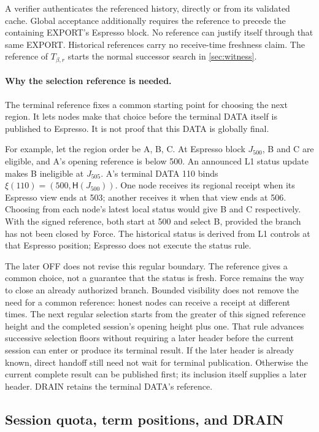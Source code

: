 \documentclass[11pt,a4paper]{article}
\newcommand{\Hash}{\mathsf H}
\begin{document}
A verifier authenticates the referenced history, directly or from its
validated cache. Global acceptance additionally requires the reference
to precede the containing EXPORT's Espresso block. No reference can
justify itself through that same EXPORT. Historical references carry no
receive-time freshness claim. The reference of $T_{\beta,r}$ starts the normal
successor search in \cref{sec:witness}.

\paragraph{Why the selection reference is needed.}
The terminal reference fixes a common starting point for choosing the next
region. It lets nodes make that choice before the terminal DATA itself is
published to Espresso. It is not proof that this DATA is globally final.

For example, let the region order be A, B, C. At Espresso block $J_{500}$,
B and C are eligible, and A's opening reference is below 500. An announced
L1 status update makes B ineligible at
$J_{505}$. A's terminal DATA 110 binds $\xi(110)=(500,\Hash(J_{500}))$.
One node receives its regional receipt when its Espresso view ends at 503;
another receives it when that view ends at 506. Choosing from each node's
latest local status would give B and C respectively. With the signed
reference, both start at 500 and select B, provided the branch has not
been closed by Force. The historical status is derived from L1 controls
at that Espresso position; Espresso does not execute the status rule.

The later OFF does not revise this regular boundary. The reference gives
a common choice, not a guarantee that the status is fresh. Force remains
the way to close an already authorized branch. Bounded visibility does
not remove the need for a common reference: honest nodes can receive a
receipt at different times. The next regular selection starts from
the greater of this signed reference height and the completed session's
opening height plus one. That rule advances successive selection floors
without requiring a later header before the current session can enter
or produce its terminal result. If the later header is already known,
direct handoff still need not wait for terminal publication. Otherwise
the current complete result can be published first; its inclusion itself
supplies a later header. DRAIN retains the terminal DATA's reference.

\subsection{Session quota, term positions, and DRAIN}
\label{sec:quota}
\end{document}
